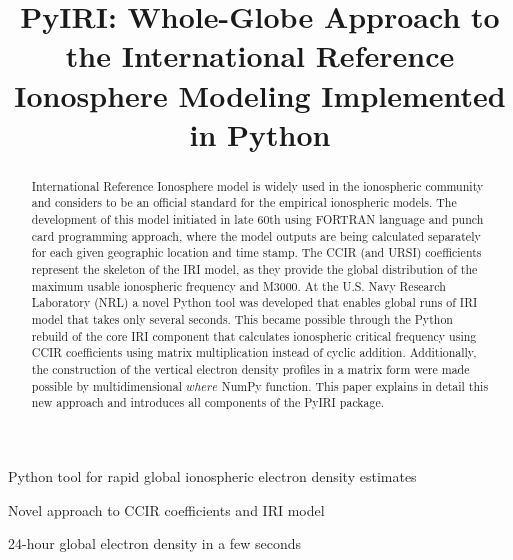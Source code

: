 \documentclass[draft]{agujournal2019}
\begin{document}
\title{PyIRI: Whole-Globe Approach to the International Reference Ionosphere Modeling Implemented in Python}







\begin{keypoints}
\item Python tool for rapid global ionospheric electron density estimates
\item Novel approach to CCIR coefficients and IRI model
\item 24-hour global electron density in a few seconds 
\end{keypoints}


\begin{abstract}
International Reference Ionosphere model is widely used in the ionospheric community and considers to be an official standard for the empirical ionospheric models. The development of this model initiated in late 60th using FORTRAN language and punch card programming approach, where the model outputs are being calculated separately for each given geographic location and time stamp. The CCIR (and URSI) coefficients represent the skeleton of the IRI model, as they provide the global distribution of the maximum usable ionospheric frequency and M3000. At the U.S. Navy Research Laboratory (NRL) a novel Python tool was developed that enables global runs of IRI model that takes only several seconds. This became possible through the Python rebuild of the core IRI component that calculates ionospheric critical frequency using CCIR coefficients using matrix multiplication instead of cyclic addition. Additionally, the construction of the vertical electron density profiles in a matrix form were made possible by multidimensional $where$ NumPy function. This paper explains in detail this new approach and introduces all components of the PyIRI package. 
\end{abstract}
\end{document}
